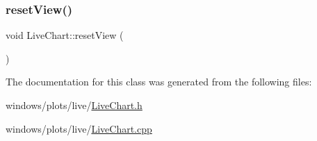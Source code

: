 \mbox{\label{class_live_chart_a337dce6b6f316c6bdb186c5248794b89}} 
\subsubsection{\texorpdfstring{reset\+View()}{resetView()}}
{\footnotesize\ttfamily void Live\+Chart\+::reset\+View (\begin{DoxyParamCaption}{ }\end{DoxyParamCaption})}



The documentation for this class was generated from the following files\+:\begin{DoxyCompactItemize}
\item 
windows/plots/live/\hyperlink{_live_chart_8h}{Live\+Chart.\+h}\item 
windows/plots/live/\hyperlink{_live_chart_8cpp}{Live\+Chart.\+cpp}\end{DoxyCompactItemize}
